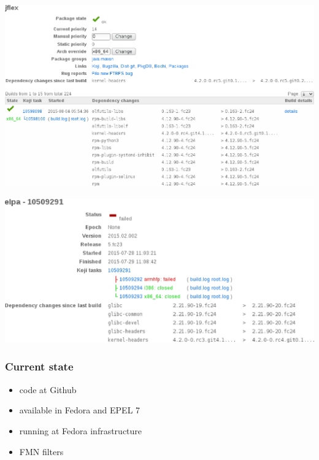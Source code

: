 \documentclass[pdftex,unicode,xcolor=table]{beamer}
\begin{document}
\begin{frame}[fragile]
  \begin{center}
    \includegraphics[scale=0.48]{koschei-frontend-2.eps}
  \end{center}
\end{frame}

\begin{frame}[fragile]
  \begin{center}
    \includegraphics[scale=0.48]{koschei-frontend-3.eps}
  \end{center}
\end{frame}

\begin{frame}
  \frametitle{Current state}
  \begin{itemize}
    \item code at Github
    \item available in Fedora and EPEL 7
    \item running at Fedora infrastructure
    \item FMN filters
  \end{itemize}
\end{frame}
\end{document}
